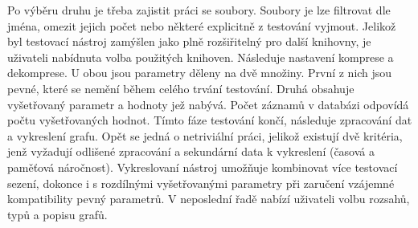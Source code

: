 Po výběru druhu je třeba zajistit práci se soubory. Soubory je lze filtrovat dle jména, omezit jejich počet nebo některé explicitně z testování vyjmout. Jelikož byl testovací nástroj zamýšlen jako plně rozšiřitelný pro další knihovny, je uživateli nabídnuta volba použitých knihoven. Následuje nastavení komprese a dekomprese. U obou jsou parametry děleny na dvě množiny. První z nich jsou pevné, které se nemění během celého trvání testování. Druhá obsahuje vyšetřovaný parametr a hodnoty jež nabývá. Počet záznamů v databázi odpovídá počtu vyšetřovaných hodnot. Tímto fáze testování končí, následuje zpracování dat a vykreslení grafu. Opět se jedná o netriviální práci, jelikož existují dvě kritéria, jenž vyžadují odlišené zpracování a sekundární data k vykreslení (časová a paměťová náročnost). Vykreslovaní nástroj umožňuje kombinovat více testovací sezení, dokonce i s rozdílnými vyšetřovanými parametry při zaručení vzájemné kompatibility pevný parametrů. V neposlední řadě nabízí uživateli volbu rozsahů, typů a popisu grafů.




